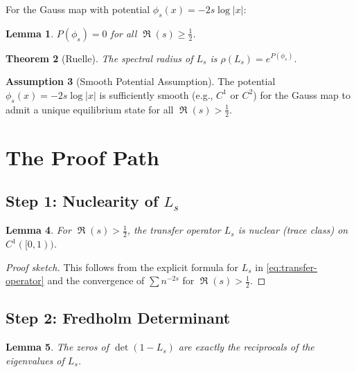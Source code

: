 \documentclass[11pt,a4paper]{article}
\newtheorem{theorem}{Theorem}[section]
\newtheorem{lemma}[theorem]{Lemma}
\theoremstyle{definition}
\newtheorem{assumption}[theorem]{Assumption}
\DeclareMathOperator{\Ree}{\Re}
\newcommand{\half}{\frac{1}{2}}
\begin{document}
For the Gauss map with potential $\phi_s(x) = -2s \log|x|$:

\begin{lemma}
\label{lem:pressure-gauss}
$P(\phi_s) = 0$ for all $\Ree(s) \geq \half$.
\end{lemma}

\begin{theorem}[Ruelle]
\label{thm:ruelle}
The spectral radius of $L_s$ is $\rho(L_s) = e^{P(\phi_s)}$.
\end{theorem}

\begin{assumption}[Smooth Potential Assumption]
\label{ass:smooth-potential}
The potential $\phi_s(x) = -2s \log|x|$ is sufficiently smooth (e.g., $C^1$ or $C^2$) for the Gauss map to admit a unique equilibrium state for all $\Ree(s) > \half$.
\end{assumption}

\section{The Proof Path}
\label{sec:proof-path}

\subsection{Step 1: Nuclearity of $L_s$}
\label{sec:step1}

\begin{lemma}
\label{lem:nuclear}
For $\Ree(s) > \half$, the transfer operator $L_s$ is nuclear (trace class) on $C^1([0,1))$.
\end{lemma}

\begin{proof}[Proof sketch]
This follows from the explicit formula for $L_s$ in \eqref{eq:transfer-operator} and the convergence of $\sum n^{-2s}$ for $\Ree(s) > \half$.
\end{proof}

\subsection{Step 2: Fredholm Determinant}
\label{sec:step2}

\begin{lemma}
\label{lem:determinant-zeros}
The zeros of $\det(1 - L_s)$ are exactly the reciprocals of the eigenvalues of $L_s$.
\end{lemma}
\end{document}
